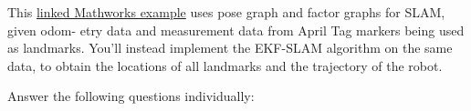 \documentclass[answers]{exam}
\begin{document}
\begin{questions}

    \question[(Bonus) 20]
    This \href{https://www.mathworks.com/help/nav/ug/landmark-slam-using-apriltag-markers.html}{linked Mathworks example} uses pose graph and factor graphs for SLAM, given odom-
    etry data and measurement data from April Tag markers being used as landmarks. You'll
    instead implement the EKF-SLAM algorithm on the same data, to obtain the locations of all
    landmarks and the trajectory of the robot.

    \begin{solution}
    \end{solution}

    \question[20]
    Answer the following questions individually:
\end{questions}
\end{document}
